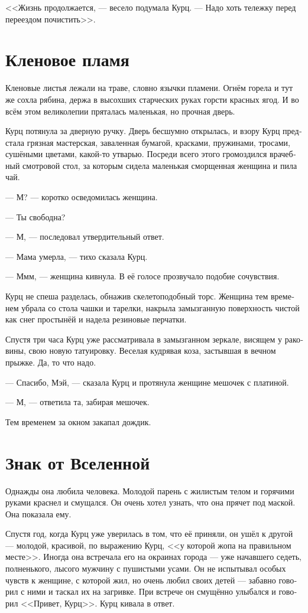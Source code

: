 \documentclass[a4paper,12pt,fleqn]{book}\usepackage{cooltooltips}\usepackage{polyglossia}\setdefaultlanguage[babelshorthands=true]{russian}\setotherlanguage{english}\defaultfontfeatures{Ligatures=TeX,Mapping=tex-text} \usepackage{xcolor}\definecolor{lightgray}{HTML}{bbbbbb}\color{lightgray}\newcommand{\ml}[3]{\textenglish{\textcolor{black}{#3}}}
\begin{document}
<<Жизнь продолжается, --- весело подумала Курц.
--- Надо хоть тележку перед переездом почистить>>.

\section{Кленовое пламя}

Кленовые листья лежали на траве, словно язычки пламени.
Огнём горела и тут же сохла рябина, держа в высохших старческих руках горсти красных ягод.
И во всём этом великолепии пряталась маленькая, но прочная дверь.

Курц потянула за дверную ручку.
Дверь бесшумно открылась, и взору Курц предстала грязная мастерская, заваленная бумагой, красками, пружинами, тросами, сушёными цветами, какой-то утварью.
Посреди всего этого громоздился врачебный смотровой стол, за которым сидела маленькая сморщенная женщина и пила чай.

--- М? --- коротко осведомилась женщина.

--- Ты свободна?

--- М, --- последовал утвердительный ответ.

--- Мама умерла, --- тихо сказала Курц.

--- Ммм, --- женщина кивнула.
В её голосе прозвучало подобие сочувствия.

Курц не спеша разделась, обнажив скелетоподобный торс.
Женщина тем временем убрала со стола чашки и тарелки, накрыла замызганную поверхность чистой как снег простынёй и надела резиновые перчатки.

Спустя три часа Курц уже рассматривала в замызганном зеркале, висящем у раковины, свою новую татуировку.
Веселая кудрявая коза, застывшая в вечном прыжке.
Да, то что надо.

--- Спасибо, Мэй, --- сказала Курц и протянула женщине мешочек с платиной.

--- М, --- ответила та, забирая мешочек.

Тем временем за окном закапал дождик.

\section{Знак от Вселенной}

Однажды она любила человека.
Молодой парень с жилистым телом и горячими руками краснел и смущался.
Он очень хотел узнать, что она прячет под маской.
Она показала ему.

Спустя год, когда Курц уже уверилась в том, что её приняли, он ушёл к другой --- молодой, красивой, по выражению Курц, <<у которой жопа на правильном месте>>.
Иногда она встречала его на окраинах города --- уже начавшего седеть, полненького, лысого мужчину с пушистыми усами.
Он не испытывал особых чувств к женщине, с которой жил, но очень любил своих детей --- забавно говорил с ними и таскал их на загривке.
При встрече он смущённо улыбался и говорил <<Привет, Курц>>.
Курц кивала в ответ.
\end{document}
